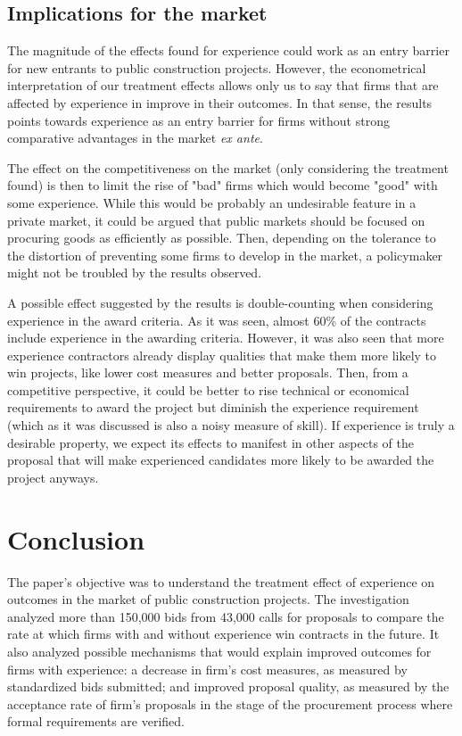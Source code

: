 \section{Implications for the market}
The magnitude of the effects found for experience could work as an entry barrier for new entrants to public construction projects. However, the econometrical interpretation of our treatment effects allows only us to say that firms that are affected by experience in improve in their outcomes. In that sense, the results points towards experience as an entry barrier for firms without strong comparative advantages in the market \textit{ex ante}.

The effect on the competitiveness on the market (only considering the treatment found) is then to limit the rise of "bad" firms which would become "good" with some experience. While this would be probably an undesirable feature in a private market, it could be argued that public markets should be focused on procuring goods as efficiently as possible. Then, depending on the tolerance to the distortion of preventing some firms to develop in the market, a policymaker might not be troubled by the results observed.

A possible effect suggested by the results is double-counting when considering experience in the award criteria. As it was seen, almost 60\% of the contracts include experience in the awarding criteria. However, it was also seen that more experience contractors already display qualities that make them more likely to win projects, like lower cost measures and better proposals. Then, from a competitive perspective, it could be better to rise technical or economical requirements to award the project but diminish the experience requirement (which as it was discussed is also a noisy measure of skill). If experience is truly a desirable property, we expect its effects to manifest in other aspects of the proposal that will make experienced candidates more likely to be awarded the project anyways.


\chapter{Conclusion}
The paper's objective was to understand the treatment effect of experience on outcomes in the market of public construction projects. The investigation analyzed more than 150,000 bids from 43,000 calls for proposals to compare the rate at which firms with and without experience win contracts in the future. It also analyzed possible mechanisms that would explain improved outcomes for firms with experience: a decrease in firm's cost measures, as measured by standardized bids submitted; and improved proposal quality, as measured by the acceptance rate of firm's proposals in the stage of the procurement process where formal requirements are verified.

